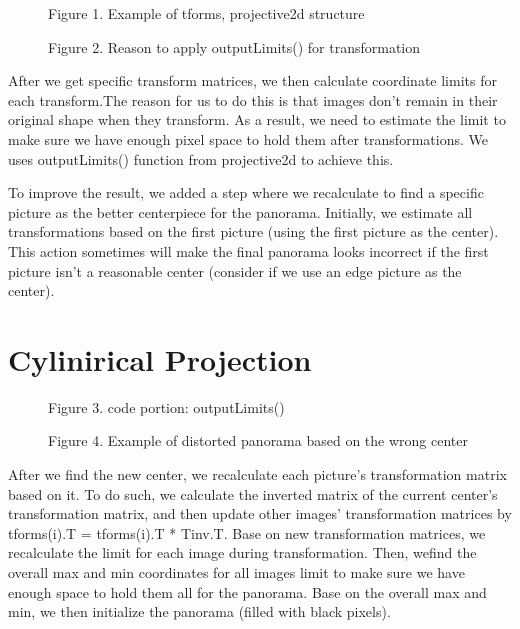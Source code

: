\documentclass{CUP-JNL-PPS}
\begin{document}
\begin{figure}[t]%
{\caption{Figure 1. Example of tforms, projective2d structure}
}
\end{figure}

\begin{figure}[t]%
{\caption{Figure 2. Reason to apply outputLimits() for transformation}
}
\end{figure}

After we get specific transform matrices, we then calculate coordinate limits for each transform.The reason for us to do this is that images don’t remain in their original shape when they transform. As a result, we need to estimate the limit to make sure we have enough pixel space to hold them after transformations. We uses outputLimits() function from projective2d to achieve this.


To improve the result, we added a step where we recalculate to find a specific picture as the better centerpiece for the panorama. Initially, we estimate all transformations based on the first picture (using the first picture as the center). This action sometimes will make the final panorama looks incorrect if the first picture isn’t a reasonable center (consider if we use an edge picture as the center).
\section{Cylinirical Projection}


\begin{figure}[t]%
{\caption{Figure 3. code portion: outputLimits()}
}
\end{figure}


\begin{figure}[t]%
{\caption{Figure 4. Example of distorted panorama based on the wrong center}
}
\end{figure}


After we find the new center, we recalculate each picture’s transformation matrix based on it. To do such, we calculate the inverted matrix of the current center’s transformation matrix, and then update other images’ transformation matrices by tforms(i).T = tforms(i).T * Tinv.T. Base on new transformation matrices, we recalculate the limit for each image during transformation. Then, wefind the overall max and min coordinates for all images limit to make sure we have enough space to hold them all for the panorama. Base on the overall max and min, we then initialize the panorama (filled with black pixels).
\end{document}

